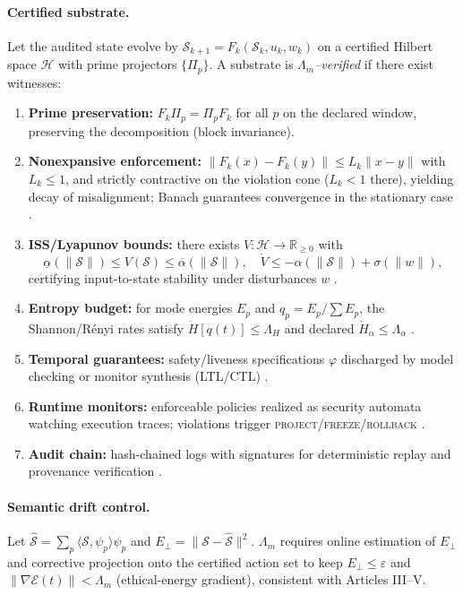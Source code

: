 \documentclass[12pt]{amsart}
\theoremstyle{plain}
\begin{document}
\paragraph{Certified substrate.}
Let the audited state evolve by $\mathcal{S}_{k+1}=F_k(\mathcal{S}_k,u_k,w_k)$ on a certified Hilbert space $\mathcal{H}$ with prime projectors $\{\Pi_p\}$. A substrate is \emph{$\Lambda_m$–verified} if there exist witnesses:
\begin{enumerate}
  \item \textbf{Prime preservation:} $F_k\Pi_p=\Pi_pF_k$ for all $p$ on the declared window, preserving the decomposition (block invariance).
  \item \textbf{Nonexpansive enforcement:} $\|F_k(x)-F_k(y)\|\le L_k\|x-y\|$ with $L_k\le 1$, and strictly contractive on the violation cone ($L_k<1$ there), yielding decay of misalignment; Banach guarantees convergence in the stationary case \cite{granas2003fixed}.
  \item \textbf{ISS/Lyapunov bounds:} there exists $V:\mathcal{H}\!\to\!\mathbb{R}_{\ge0}$ with
  \[
  \underline{\alpha}(\|\mathcal{S}\|)\le V(\mathcal{S})\le \overline{\alpha}(\|\mathcal{S}\|),\quad
  \dot V\le -\alpha(\|\mathcal{S}\|)+\sigma(\|w\|),
  \]
  certifying input-to-state stability under disturbances $w$ \cite{sontag1989iss,khalil2002nonlinear}.
  \item \textbf{Entropy budget:} for mode energies $E_p$ and $q_p=E_p/\sum E_p$, the Shannon/Rényi rates satisfy $\dot H[q(t)]\le \Lambda_H$ and declared $\dot H_\alpha\le \Lambda_\alpha$ \cite{cover2006elements}.
  \item \textbf{Temporal guarantees:} safety/liveness specifications $\varphi$ discharged by model checking or monitor synthesis (LTL/CTL) \cite{clarke1999model,baier2008model}.
  \item \textbf{Runtime monitors:} enforceable policies realized as security automata watching execution traces; violations trigger \textsc{project}/\textsc{freeze}/\textsc{rollback} \cite{schneider2000enforceable,boyd2004convex}.
  \item \textbf{Audit chain:} hash-chained logs with signatures for deterministic replay and provenance verification \cite{merkle1989certified}.
\end{enumerate}

\paragraph{Semantic drift control.}
Let $\widehat{\mathcal{S}}=\sum_p\langle\mathcal{S},\psi_p\rangle\psi_p$ and $E_\perp=\|\mathcal{S}-\widehat{\mathcal{S}}\|^2$. $\Lambda_m$ requires online estimation of $E_\perp$ and corrective projection onto the certified action set to keep $E_\perp\le\varepsilon$ and $\|\nabla\mathcal{E}(t)\|<\Lambda_m$ (ethical-energy gradient), consistent with Articles III–V.
\end{document}
